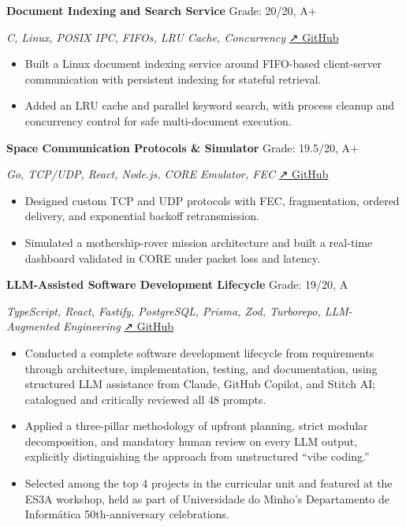 \documentclass[11pt,a4paper]{article}
\newenvironment{cvitem}[2]{%
  \vspace{0.25em}
  \noindent
  \textbf{\color{heading}#1}%
  \hfill
  {\small\color{muted}#2}%
  \par
}{}
\newcommand{\cvsub}[2]{%
  \noindent
  {\itshape\color{text}#1}%
  \hfill
  {\small\color{muted}#2}%
  \par
}
\newenvironment{cvbullets}{%
  \begin{itemize}[leftmargin=1.2em, itemsep=0em, topsep=0em, parsep=0em]
}{%
  \end{itemize}
}
\begin{document}
\begin{cvitem}{Document Indexing and Search Service}{Grade: 20/20, A+}
\cvsub{C, Linux, POSIX IPC, FIFOs, LRU Cache,
  Concurrency}{\href{https://github.com/marcosevegrand}{↗ GitHub}}
\begin{cvbullets}
  \item Built a Linux document indexing service around FIFO-based
    client-server communication with persistent indexing for stateful
    retrieval.
  \item Added an LRU cache and parallel keyword search, with process
    cleanup and concurrency control for safe multi-document execution.
\end{cvbullets}
\end{cvitem}

\begin{cvitem}{Space Communication Protocols \& Simulator}{Grade: 19.5/20, A+}
\cvsub{Go, TCP/UDP, React, Node.js, CORE Emulator,
  FEC}{\href{https://github.com/marcosevegrand}{↗ GitHub}}
\begin{cvbullets}
  \item Designed custom TCP and UDP protocols with FEC, fragmentation,
    ordered delivery, and exponential backoff retransmission.
  \item Simulated a mothership-rover mission architecture and built a
    real-time dashboard validated in CORE under packet loss and latency.
\end{cvbullets}
\end{cvitem}

\begin{cvitem}{LLM-Assisted Software Development Lifecycle}{Grade: 19/20, A}
\cvsub{TypeScript, React, Fastify, PostgreSQL, Prisma, Zod, Turborepo,
  LLM-Augmented Engineering}{\href{https://github.com/marcosevegrand}{↗ GitHub}}
\begin{cvbullets}
  \item Conducted a complete software development lifecycle from
    requirements through architecture, implementation, testing, and
    documentation, using structured LLM assistance from Claude, GitHub
    Copilot, and Stitch AI; catalogued and critically reviewed all 48
    prompts.
  \item Applied a three-pillar methodology of upfront planning, strict
    modular decomposition, and mandatory human review on every LLM output,
    explicitly distinguishing the approach from unstructured ``vibe
    coding.''
  \item Selected among the top 4 projects in the curricular unit and
    featured at the ES3A workshop, held as part of Universidade do Minho's
    Departamento de Informática 50th-anniversary celebrations.
\end{cvbullets}
\end{cvitem}
\end{document}
